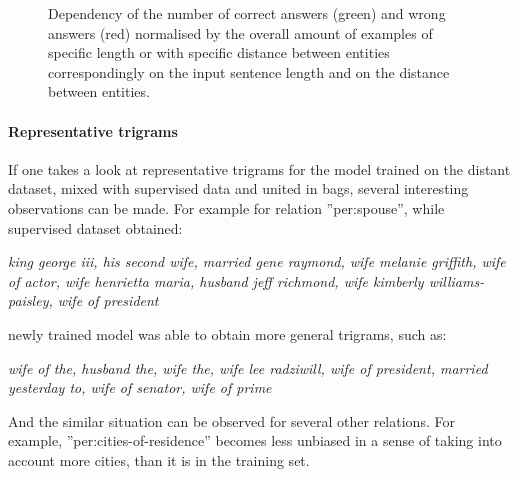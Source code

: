 \begin{figure}
\centering
{}
\caption[Correlation of amount of correct and wrong answers with sentence length and distance between entities]{Dependency of the number of correct answers (green) and wrong answers (red) normalised by the overall amount of examples of specific length or with specific distance between entities correspondingly on the input sentence length and on the distance between entities.}
\label{fig:dist-depend}
\end{figure}

\paragraph{Representative trigrams}
If one takes a look at representative trigrams for the model trained on the distant dataset, mixed with 
supervised data and united in bags, several interesting observations can be made.
For example for relation ''per:spouse'', while supervised dataset obtained:

\textit{king george iii, his second wife, married gene raymond, wife melanie griffith, wife of actor, wife henrietta maria, husband jeff richmond, wife kimberly williams-paisley, wife of president}

newly trained model was able to obtain more general trigrams, such as:

\textit{wife of the, husband the, wife the, wife lee radziwill, wife of president, married yesterday to, wife of senator, wife of prime}

And the similar situation can be observed for several other relations. For example, 
''per:cities-of-residence'' becomes less unbiased in a sense of taking into account more cities, 
than it is in the training set.

